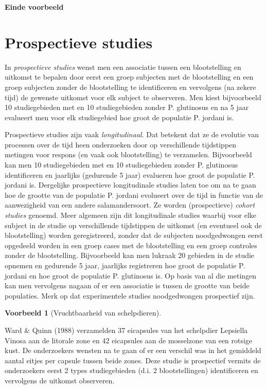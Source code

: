 \documentclass[
  12pt,dutch]{book}
\theoremstyle{definition}
\theoremstyle{definition}
\newtheorem{example}{Voorbeeld}[chapter]
\theoremstyle{definition}
\theoremstyle{definition}
\theoremstyle{remark}
\begin{document}
\textbf{Einde voorbeeld}

\section{Prospectieve studies}\label{subsec:design:prosp}

In \emph{prospectieve studies} wenst men een associatie tussen een
blootstelling en uitkomst te bepalen door eerst een groep subjecten met de
blootstelling en een groep subjecten zonder de blootstelling te
identificeren en vervolgens (na zekere tijd) de gewenste uitkomst voor elk subject
te observeren. Men kiest bijvoorbeeld 10 studiegebieden met en 10 studiegebieden zonder P. glutinosus en na 5 jaar evalueert men voor elk studiegebied hoe groot de populatie P. jordani is.

Prospectieve studies zijn vaak \emph{longitudinaal}. Dat betekent dat ze
de evolutie van processen over de tijd heen onderzoeken door op
verschillende tijdstippen metingen voor respons (en vaak ook blootstelling) te
verzamelen. Bijvoorbeeld kan men 10 studiegebieden met en 10 studiegebieden zonder P. glutinosus identificeren en jaarlijks (gedurende 5 jaar) evalueren hoe groot de populatie P. jordani is. Dergelijke prospectieve longitudinale studies laten toe om na te gaan hoe de grootte van de populatie P. jordani evolueert over de tijd in functie van de aanwezigheid van een andere salamandersoort. Ze
worden (prospectieve) \emph{cohort studies} genoemd. Meer algemeen zijn
dit longitudinale studies waarbij voor elke subject in de studie op
verschillende tijdstippen de uitkomst (en eventueel ook de blootstelling) worden geregistreerd,
zonder dat de subjecten noodgedwongen eerst opgedeeld worden in een groep
cases met de blootstelling en een groep controles zonder de blootstelling.
Bijvoorbeeld kan men lukraak 20 gebieden in de studie
opnemen en gedurende 5 jaar, jaarlijks registreren hoe groot de populatie P. jordani en hoe groot de populatie P. glutinosus is. Op
basis van al die metingen kan men vervolgens nagaan of er een associatie is
tussen de grootte van beide populaties. Merk op dat experimentele studies noodgedwongen prospectief zijn.

\begin{example}[Vruchtbaarheid van schelpdieren]
\protect\hypertarget{exm:unnamed-chunk-85}{}\label{exm:unnamed-chunk-85}~
\end{example}

Ward \& Quinn (1988) verzamelden 37 eicapsules van het schelpdier Lepsiella Vinosa aan de litorale zone en 42 eicapsules aan de mosselzone van een rotsige kust. De onderzoekers wensten na te gaan of er een verschil was in het gemiddeld aantal eitjes per capsule tussen beide zones. Deze studie is prospectief vermits de onderzoekers eerst 2 types studiegebieden (d.i. 2 blootstellingen) identificeren en vervolgens de uitkomst observeren.
\end{document}
